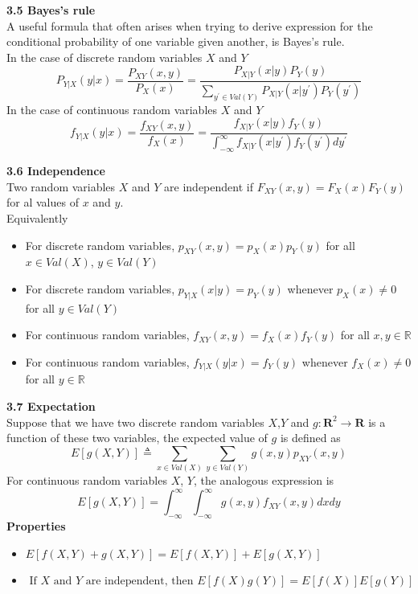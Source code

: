 \documentclass[10pt,a4paper,oneside]{beamer}
\begin{document}
\begin{frame}
\vspace{0.3cm}
{\bfseries 3.5 Bayes's rule} 
\vspace{0.5cm}
\\A useful formula that often arises when trying to derive expression for the conditional probability of one variable given another, is Bayes's rule.
\vspace{0.3cm}
\\In the case of discrete random variables $X$ and $Y$
\[
P_{Y|X}(y | x)=\frac{P_{X Y}(x, y)}{P_{X}(x)}=\frac{P_{X|Y}(x | y) P_{Y}(y)}{\sum_{y^{\prime} \in V a l(Y)} P_{X | Y}\left(x | y^{\prime}\right) P_{Y}\left(y^{\prime}\right)}
\]
In the case of continuous random variables $X$ and $Y$
\[
f_{Y|X}(y | x)=\frac{f_{X Y}(x, y)}{f_{X}(x)}=\frac{f_{X|Y}(x | y) f_{Y}(y)}{\int_{-\infty}^{\infty} f_{X | Y}\left(x | y^{\prime}\right) f_{Y}\left(y^{\prime}\right) d y^{\prime}}
\]
\end{frame}
\begin{frame}
\vspace{0.3cm}
{\bfseries 3.6 Independence} 
\vspace{0.5cm}
\\Two random variables $X$ and $Y$ are independent if $F_{XY}(x,y)=F_X(x)F_Y(y)$for al values of $x$ and $y$. \\Equivalently
 \begin{itemize}
 \item For discrete random variables, $p_{XY}(x,y)=p_X(x)p_Y(y)$ for all $x\in Val(X)$, $y\in Val(Y)$
 \item For discrete random variables, $p_{Y|X}(x|y)=p_Y(y)$ whenever $p_X(x)\neq 0$ for all $y\in Val(Y)$
 \item For continuous random variables, $f_{X Y}(x, y)=f_{X}(x) f_{Y}(y)$ for all $x,y \in \mathbb{R}$
 \item For continuous random variables, $f_{Y | X}(y | x)=f_{Y}(y)$ whenever $f_X(x)\neq0$ for all $y\in \mathbb{R}$
 \end{itemize}
\end{frame}
\begin{frame}
\vspace{0.3cm}
{\bfseries 3.7 Expectation} 
\vspace{0.5cm}
\\Suppose that we have two discrete random variables $X$,$Y$ and $g : \mathbf{R}^{2} \longrightarrow \mathbf{R}$ is a function of these two variables, the expected value of $g$ is defined as
\[
E[g(X, Y)] \triangleq \sum_{x \in V a l(X)} \sum_{y \in V a l(Y)} g(x, y) p_{X Y}(x, y)
\]
For continuous random variables $X$, $Y$, the analogous expression is
\[
E[g(X, Y)]=\int_{-\infty}^{\infty} \int_{-\infty}^{\infty} g(x, y) f_{X Y}(x, y) d x d y
\]
{\bfseries Properties}
\vspace{0.3cm}
\begin{itemize}
\item $E[f(X, Y)+g(X, Y)]=E[f(X, Y)]+E[g(X, Y)]$
\item $\text { If } X \text { and } Y \text { are independent, then } E[f(X) g(Y)]=E[f(X)] E[g(Y)]$
\end{itemize} 
\end{frame}
\end{document}
